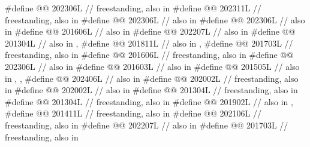 \begin{codeblock}
#define @@              202306L // freestanding, also in 
#define @@              202311L // freestanding, also in 
#define @@             202306L // also in 
#define @@                      202306L // also in 
#define @@                           201606L // also in 
#define @@                         202207L // also in 
#define @@        201304L // also in , 
#define @@          201811L
  // also in , 
#define @@        201703L // freestanding, also in 
#define @@ 201606L // freestanding, also in 
#define @@                    202306L // also in 
#define @@                             201603L // also in 
#define @@     201505L
  // also in , , 
#define @@                    202406L // also in 
#define @@                          202002L // freestanding, also in 
#define @@      202002L // also in 
#define @@                  201304L // freestanding, also in 
#define @@        201304L // freestanding, also in 
#define @@                       201902L // also in , 
#define @@                            201411L // freestanding, also in 
#define @@                          202106L // freestanding, also in 
#define @@                     202207L // also in 
#define @@                      201703L // freestanding, also in 

\end{codeblock}
